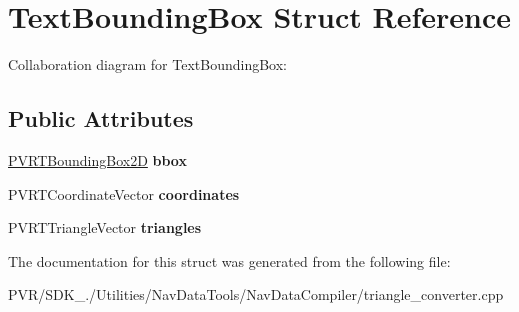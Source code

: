 \hypertarget{struct_text_bounding_box}{\section{Text\+Bounding\+Box Struct Reference}
\label{struct_text_bounding_box}
}


Collaboration diagram for Text\+Bounding\+Box\+:
\subsection*{Public Attributes}
\begin{DoxyCompactItemize}
\item 
\hypertarget{struct_text_bounding_box_a308ad1227e641aa711b355bf987d0f77}{\hyperlink{structpvrnavigation_1_1_p_v_r_t_bounding_box2_d}{P\+V\+R\+T\+Bounding\+Box2\+D} {\bfseries bbox}}\label{struct_text_bounding_box_a308ad1227e641aa711b355bf987d0f77}

\item 
\hypertarget{struct_text_bounding_box_aa38c87a95e978b6551dc20b653241c90}{P\+V\+R\+T\+Coordinate\+Vector {\bfseries coordinates}}\label{struct_text_bounding_box_aa38c87a95e978b6551dc20b653241c90}

\item 
\hypertarget{struct_text_bounding_box_acd162684eff447e908cf38cbe033d301}{P\+V\+R\+T\+Triangle\+Vector {\bfseries triangles}}\label{struct_text_bounding_box_acd162684eff447e908cf38cbe033d301}

\end{DoxyCompactItemize}


The documentation for this struct was generated from the following file\+:\begin{DoxyCompactItemize}
\item 
P\+V\+R/\+S\+D\+K\+\_./\+Utilities/\+Nav\+Data\+Tools/\+Nav\+Data\+Compiler/triangle\+\_\+converter.\+cpp\end{DoxyCompactItemize}
